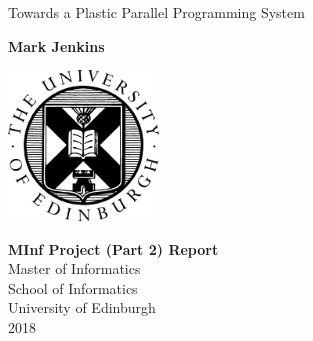 \documentclass{report}
\begin{document}
\begin{titlepage}
    \begin{center}
        \vspace*{3cm}
        
        \Huge
        Towards a Plastic Parallel Programming System
        
        \vspace{1.5cm}
        
        \large
        \textbf{Mark Jenkins}
        
        \vspace{2.5cm}

        \includegraphics[width=0.3\textwidth]{university}

        \vspace{2.5cm}
        
        \textbf{MInf Project (Part 2) Report}\\
        Master of Informatics\\
        School of Informatics\\
        University of Edinburgh\\
        2018
    \end{center}
\end{titlepage}

\setlength\parskip{1em}
\setlength\parindent{0pt}
\end{document}
